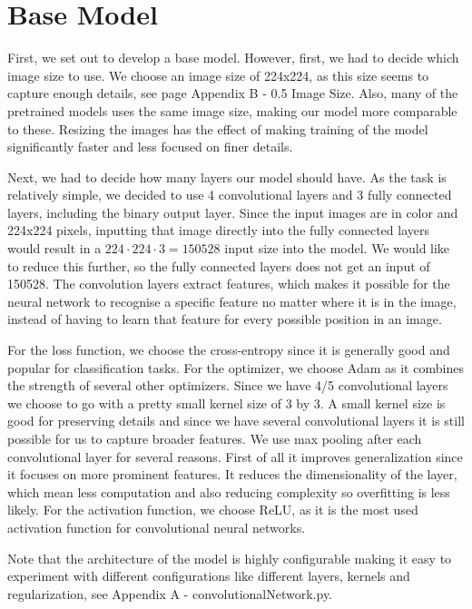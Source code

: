 \section{Base Model}
First, we set out to develop a base model. However, first, we had to decide which image size to use. We choose an image size of 224x224, as this size seems to capture enough details, see page Appendix B - 0.5 Image Size. Also, many of the pretrained models uses the same image size, making our model more comparable to these. Resizing the images has the effect of making training of the model significantly faster and less focused on finer details.

Next, we had to decide how many layers our model should have. As the task is relatively simple, we decided to use 4 convolutional layers and 3 fully connected layers, including the binary output layer. Since the input images are in color and 224x224 pixels, inputting that image directly into the fully connected layers would result in a $224 \cdot 224 \cdot 3 = 150528$ input size into the model. We would like to reduce this further, so the fully connected layers does not get an input of 150528. The convolution layers extract features, which makes it possible for the neural network to recognise a specific feature no matter where it is in the image, instead of having to learn that feature for every possible position in an image.

For the loss function, we choose the cross-entropy since it is generally good and popular for classification tasks. For the optimizer, we choose Adam as it combines the strength of several other optimizers. Since we have 4/5 convolutional layers we choose to go with a pretty small kernel size of 3 by 3. A small kernel size is good for preserving details and since we have several convolutional layers it is still possible for us to capture broader features. We use max pooling after each convolutional layer for several reasons. First of all it improves generalization since it focuses on more prominent features. It reduces the dimensionality of the layer, which mean less computation and also reducing complexity so overfitting is less likely. For the activation function, we choose ReLU, as it is the most used activation function for convolutional neural networks.

Note that the architecture of the model is highly configurable making it easy to experiment with different configurations like different layers, kernels and regularization, see Appendix A - convolutionalNetwork.py. 

